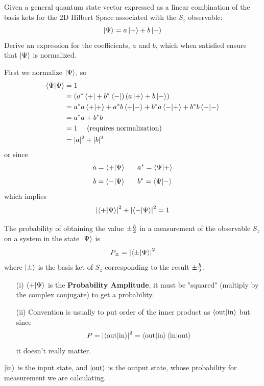 \documentclass[english, 11pt]{article}
\begin{document}
          \begin{exmp}
            Given a general quantum state vector expressed as a linear combination of the basis kets for the 2D Hilbert Space associated with the $S_z$ observable:
            \[ \left|\Psi\right\rangle = a \left|+\right\rangle + b\left|-\right\rangle \]
            Derive an expression for the coefficients, $a$ and $b$, which when satisfied ensure that $\left|\Psi\right\rangle$ is normalized.
          \end{exmp}

          First we normalize $\left|\Psi\right\rangle$, so
          \begin{align*}
             \braket{\Psi}{\Psi} & = 1 \\
             &= \left( a^*\bra{+} + b^*\bra{-} \right)\left( a\ket{+} + b\ket{-} \right) \\
             & =a^*a\braket{+}{+} + a^*b\braket{+}{-} + b^*a\braket{-}{+} + b^*b\braket{-}{-} \\
             & = a^*a + b^*b \\
             & = 1 \mbox{ \ \ \ (requires normalization)} \\
             & = |a|^2 + |b|^2
          \end{align*}
          or since
          \[ a = \braket{+}{\Psi} \ \ \ \ \ a^* = \braket{\Psi}{+} \]
          \[ b = \braket{-}{\Psi} \ \ \ \ \ b^* = \braket{\Psi}{-} \]
          which implies
          \[ \left| \braket{+}{\Psi} \right|^2 + \left| \braket{-}{\Psi} \right|^2 = 1 \]

          \begin{defn}[Postulate 4]\label{postulate_4}
            The probability of obtaining the value $\pm \frac{\hbar}{2}$ in a measurement of the observable $S_z$ on a system in the state $\left|\Psi\right\rangle$ is
            \[ P_{\pm} = \left| \braket{\pm}{\Psi} \right|^2 \]
            where $\left|\pm\right\rangle$ is the basis ket of $S_z$ corresponding to the result $\pm \frac{\hbar}{2}$.
          \end{defn}

          \begin{itemize}
            \item[(i)] $\braket{+}{\Psi}$ is the \textbf{Probability Amplitude}, it must be "squared" (multiply by the complex conjugate) to get a probability.
            \item[(ii)] Convention is usually to put order of the inner product as $\braket{\mbox{out}}{\mbox{in}}$ but since
            \[ P = \left| \braket{\mbox{out}}{\mbox{in}}\right|^2  = \braket{\mbox{out}}{\mbox{in}} \braket{\mbox{in}}{\mbox{out}}\]
            it doesn't really matter.
          \end{itemize}
          $\left|\mbox{in}\right\rangle$ is the input state, and $\left|\mbox{out}\right\rangle$ is the output state, whose probability for measurement we are calculating.
\end{document}
